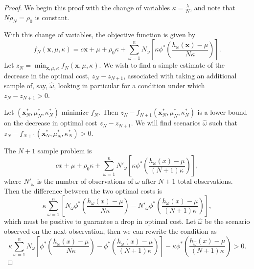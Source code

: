\documentclass[ijoc,nonblindrev]{informs3} %
\newcommand{\x}{\mathbf{x}}
\begin{document}
\begin{proof}
	We begin this proof with the change of variables $\kappa = \frac{\lambda}{N}$, and note that $N\rho_N = \rho_0$ is constant.
	
	With this change of variables, the objective function is given by
	\[
		f_N(\x,\mu,\kappa) = c\x + \mu + \rho_0 \kappa + \sum_{\omega = 1}^n N_\omega \left[ \kappa \phi^*\left(\frac{h_\omega(\x) - \mu}{N\kappa} \right) \right].
	\]
	Let $z_N = \min_{\x,\mu,\kappa} f_N(\x,\mu,\kappa)$.
	We wish to find a simple estimate of the decrease in the optimal cost, $z_N - z_{N+1}$, associated with taking an additional sample of, say, $\hat{\omega}$, looking in particular for a condition under which $z_N - z_{N+1} > 0$.
	
	Let $(\x^*_N,\mu^*_N,\kappa^*_N)$ minimize $f_N$.
	Then $z_N - f_{N+1}(\x^*_N,\mu^*_N,\kappa^*_N)$ is a lower bound on the decrease in optimal cost $z_N - z_{N+1}$.
	We will find scenarios $\hat{\omega}$ such that $z_N - f_{N+1}(\x^*_N,\mu^*_N,\kappa^*_N) > 0$.

	The $N+1$ sample problem is
	\[
		cx + \mu + \rho_0 \kappa + \sum_{\omega = 1}^n N'_\omega \left[ \kappa \phi^*\left(\frac{h_\omega(x) - \mu}{(N+1)\kappa} \right) \right],
	\]
	where $N'_\omega$ is the number of observations of $\omega$ after $N+1$ total observations.
	Then the difference between the two optimal costs is
	\[
		\kappa \sum_{\omega=1}^n \left[ N_\omega \phi^*\left(\frac{h_\omega(x) - \mu}{N\kappa} \right) - N'_\omega \phi^*\left(\frac{h_\omega(x) - \mu}{(N+1)\kappa} \right) \right],
	\]
	which must be positive to guarantee a drop in optimal cost.
	Let $\hat{\omega}$ be the scenario observed on the next observation, then we can rewrite the condition as
	\begin{equation} \label{eq:raw_cond}
		\kappa \sum_{\omega=1}^n N_\omega \left[ \phi^*\left(\frac{h_\omega(x) - \mu}{N\kappa} \right) - \phi^*\left(\frac{h_\omega(x) - \mu}{(N+1)\kappa} \right) \right] - \kappa \phi^*\left(\frac{h_{\hat{\omega}}(x) - \mu}{(N+1)\kappa}\right) > 0.
	\end{equation}


\end{proof}
\end{document}
